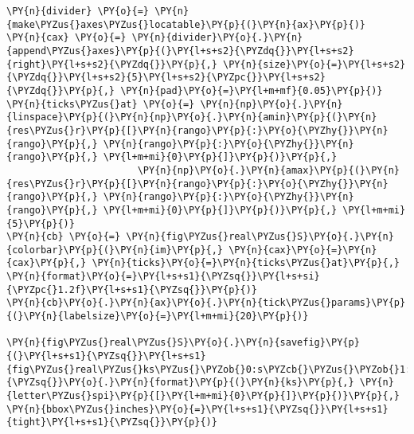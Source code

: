 \begin{Verbatim}[commandchars=\\\{\}]
\PY{n}{divider} \PY{o}{=} \PY{n}{make\PYZus{}axes\PYZus{}locatable}\PY{p}{(}\PY{n}{ax}\PY{p}{)}
\PY{n}{cax} \PY{o}{=} \PY{n}{divider}\PY{o}{.}\PY{n}{append\PYZus{}axes}\PY{p}{(}\PY{l+s+s2}{\PYZdq{}}\PY{l+s+s2}{right}\PY{l+s+s2}{\PYZdq{}}\PY{p}{,} \PY{n}{size}\PY{o}{=}\PY{l+s+s2}{\PYZdq{}}\PY{l+s+s2}{5}\PY{l+s+s2}{\PYZpc{}}\PY{l+s+s2}{\PYZdq{}}\PY{p}{,} \PY{n}{pad}\PY{o}{=}\PY{l+m+mf}{0.05}\PY{p}{)}
\PY{n}{ticks\PYZus{}at} \PY{o}{=} \PY{n}{np}\PY{o}{.}\PY{n}{linspace}\PY{p}{(}\PY{n}{np}\PY{o}{.}\PY{n}{amin}\PY{p}{(}\PY{n}{res\PYZus{}r}\PY{p}{[}\PY{n}{rango}\PY{p}{:}\PY{o}{\PYZhy{}}\PY{n}{rango}\PY{p}{,} \PY{n}{rango}\PY{p}{:}\PY{o}{\PYZhy{}}\PY{n}{rango}\PY{p}{,} \PY{l+m+mi}{0}\PY{p}{]}\PY{p}{)}\PY{p}{,}
                       \PY{n}{np}\PY{o}{.}\PY{n}{amax}\PY{p}{(}\PY{n}{res\PYZus{}r}\PY{p}{[}\PY{n}{rango}\PY{p}{:}\PY{o}{\PYZhy{}}\PY{n}{rango}\PY{p}{,} \PY{n}{rango}\PY{p}{:}\PY{o}{\PYZhy{}}\PY{n}{rango}\PY{p}{,} \PY{l+m+mi}{0}\PY{p}{]}\PY{p}{)}\PY{p}{,} \PY{l+m+mi}{5}\PY{p}{)} 
\PY{n}{cb} \PY{o}{=} \PY{n}{fig\PYZus{}real\PYZus{}S}\PY{o}{.}\PY{n}{colorbar}\PY{p}{(}\PY{n}{im}\PY{p}{,} \PY{n}{cax}\PY{o}{=}\PY{n}{cax}\PY{p}{,} \PY{n}{ticks}\PY{o}{=}\PY{n}{ticks\PYZus{}at}\PY{p}{,} \PY{n}{format}\PY{o}{=}\PY{l+s+s1}{\PYZsq{}}\PY{l+s+si}{\PYZpc{}1.2f}\PY{l+s+s1}{\PYZsq{}}\PY{p}{)}
\PY{n}{cb}\PY{o}{.}\PY{n}{ax}\PY{o}{.}\PY{n}{tick\PYZus{}params}\PY{p}{(}\PY{n}{labelsize}\PY{o}{=}\PY{l+m+mi}{20}\PY{p}{)}

\PY{n}{fig\PYZus{}real\PYZus{}S}\PY{o}{.}\PY{n}{savefig}\PY{p}{(}\PY{l+s+s1}{\PYZsq{}}\PY{l+s+s1}{fig\PYZus{}real\PYZus{}ks\PYZus{}\PYZob{}0:s\PYZcb{}\PYZus{}\PYZob{}1:s\PYZcb{}}\PY{l+s+s1}{\PYZsq{}}\PY{o}{.}\PY{n}{format}\PY{p}{(}\PY{n}{ks}\PY{p}{,} \PY{n}{letter\PYZus{}spi}\PY{p}{[}\PY{l+m+mi}{0}\PY{p}{]}\PY{p}{)}\PY{p}{,} \PY{n}{bbox\PYZus{}inches}\PY{o}{=}\PY{l+s+s1}{\PYZsq{}}\PY{l+s+s1}{tight}\PY{l+s+s1}{\PYZsq{}}\PY{p}{)}



\end{Verbatim}
